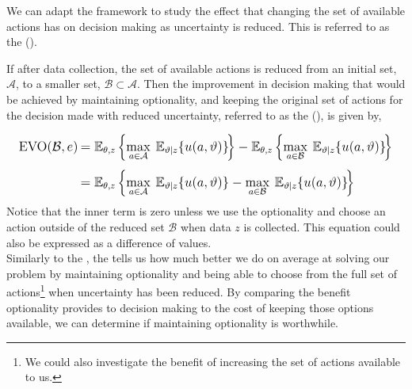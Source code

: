 We can adapt the  framework to study the effect that changing the set of available actions has on decision making as uncertainty is reduced. This is referred to as the  ().

If after data collection, the set of available actions is reduced from an initial set, $\mathcal{A}$, to a smaller set, $\mathcal{B} \subset \mathcal{A}$. Then the improvement in decision making that would be achieved by maintaining optionality, and keeping the original set of actions for the decision made with reduced uncertainty, referred to as the  (), is given by,

\begin{align}
\begin{split} \label{eq:methodology-voo}
    \mathlarger{\text{EVO}(\mathcal{B},e)} \:
    &\mathlarger{
        = \mathbb{E}_{\theta,z} \left\lbrace \max_{a \in \mathcal{A}} \: \mathbb{E}_{\vartheta|z}\lbrace u(a,\vartheta) \rbrace \!\right\rbrace - \mathbb{E}_{\theta,z} \left\lbrace \max_{a \in \mathcal{B}} \: \mathbb{E}_{\vartheta|z}\lbrace u(a,\vartheta) \rbrace \!\right\rbrace
    }\\[1ex]
    &\mathlarger{
        = \mathbb{E}_{\theta,z} \left\lbrace \max_{a \in \mathcal{A}} \: \mathbb{E}_{\vartheta|z}\lbrace u(a,\vartheta) \rbrace - \max_{a \in \mathcal{B}} \: \mathbb{E}_{\vartheta|z}\lbrace u(a,\vartheta) \rbrace \!\right\rbrace
    }
\end{split}
\end{align}
Notice that the inner term is zero unless we use the optionality and choose an action outside of the reduced set $\mathcal{B}$ when data $z$ is collected. This equation could also be expressed as a difference of  values.\\

Similarly to the , the  tells us how much better we do on average at solving our problem by maintaining optionality and being able to choose from the full set of actions\footnote{We could also investigate the benefit of increasing the set of actions available to us.} when uncertainty has been reduced. By comparing the benefit optionality provides to decision making to the cost of keeping those options available, we can determine if maintaining optionality is worthwhile.\\

